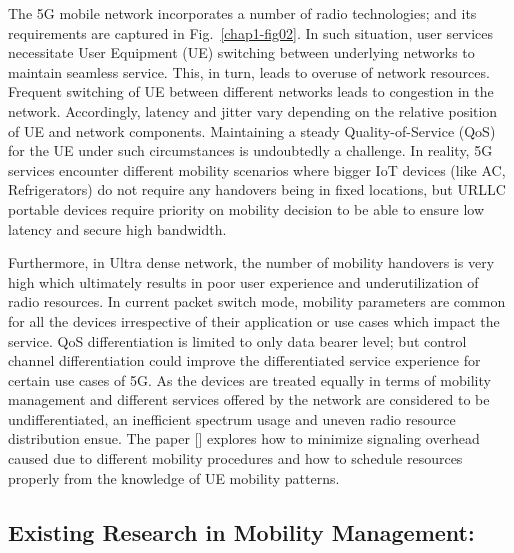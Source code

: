 \begin{multicols}{2}
The 5G mobile network incorporates a number of radio technologies; and its requirements are captured in Fig.~\ref{chap1-fig02}. In such situation, user services necessitate User Equipment (UE) switching between underlying networks to maintain seamless service. This, in turn, leads to overuse of network resources. Frequent switching of UE between different networks leads to congestion in the network. Accordingly, latency and jitter vary depending on the relative position of UE and network components. Maintaining a steady Quality-of-Service (QoS) for the UE under such circumstances is undoubtedly a challenge. In reality, 5G services encounter different mobility scenarios where bigger IoT devices (like AC, Refrigerators) do not require any handovers being in fixed locations, but URLLC portable devices require priority on mobility decision to be able to ensure low latency and secure high bandwidth.

Furthermore, in Ultra dense network, the number of mobility handovers is very high which ultimately results in poor user experience and underutilization of radio resources. In current packet switch mode, mobility parameters are common for all the devices irrespective of their application or use cases which impact the service. QoS differentiation is limited to only data bearer level; but control channel differentiation could improve the differentiated service experience for certain use cases of 5G. As the devices are treated equally in terms of mobility management and different services offered by the network are considered to be undifferentiated, an inefficient spectrum usage and uneven radio resource distribution ensue. The paper [\cite{art1-key01}] explores how to minimize signaling overhead caused due to different mobility procedures and how to schedule resources properly from the knowledge of UE mobility patterns.



\subsection{Existing Research in Mobility Management:}


\end{multicols}
